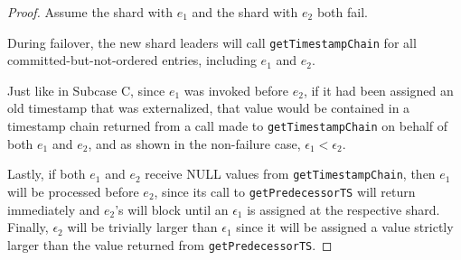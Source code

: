 \begin{proof}
Assume the shard with $e_1$ and the shard with $e_2$ both fail.

During failover, the new shard leaders will call \texttt{getTimestampChain} for all committed-but-not-ordered entries, including $e_1$ and $e_2$.

Just like in Subcase C, since $e_1$ was invoked before $e_2$, if it had been assigned an old timestamp that was externalized, that value would be contained in a timestamp chain returned from a call made to \texttt{getTimestampChain} on behalf of both $e_1$ and $e_2$, and as shown in the non-failure case, $\epsilon_1 < \epsilon_2$. 

Lastly, if both $e_1$ and $e_2$ receive NULL values from \texttt{getTimestampChain}, then $e_1$ will be processed before $e_2$, since its call to \texttt{getPredecessorTS} will return immediately and $e_2$'s will block until an $\epsilon_1$ is assigned at the respective shard. Finally, $\epsilon_2$ will be trivially larger than $\epsilon_1$ since it will be assigned a value strictly larger than the value returned from \texttt{getPredecessorTS}.








\end{proof}
